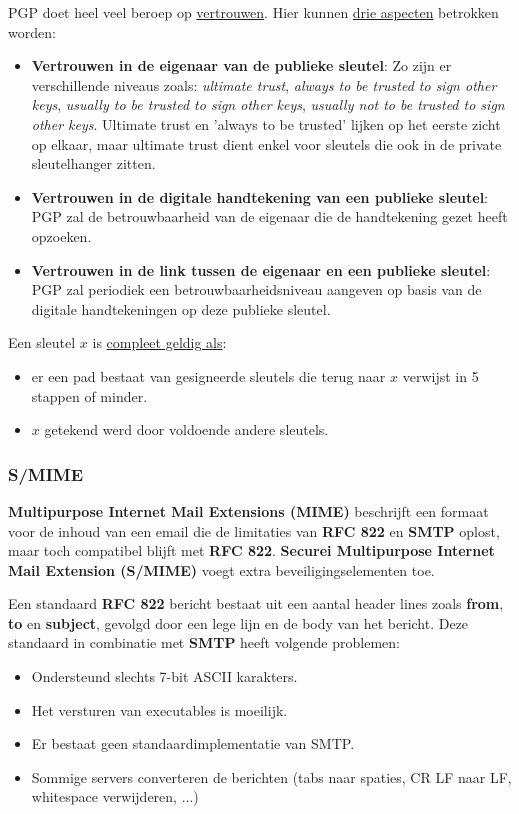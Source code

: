 \documentclass{report}
\begin{document}
	PGP doet heel veel beroep op \underline{vertrouwen}. Hier kunnen \underline{drie aspecten} betrokken worden:
	\begin{itemize}
		\item[\info] \textbf{Vertrouwen in de eigenaar van de publieke sleutel}: Zo zijn er verschillende niveaus zoals: \emph{ultimate trust}, \emph{always to be trusted to sign other keys}, \emph{usually to be trusted to sign other keys}, \emph{usually not to be trusted to sign other keys}. Ultimate trust en 'always to be trusted' lijken op het eerste zicht op elkaar, maar ultimate trust dient enkel voor sleutels die ook in de private sleutelhanger zitten.
		\item[\info] \textbf{Vertrouwen in de digitale handtekening van een publieke sleutel}: PGP zal de betrouwbaarheid van de eigenaar die de handtekening gezet heeft opzoeken.
		\item[\info] \textbf{Vertrouwen in de link tussen de eigenaar en een publieke sleutel}: PGP zal periodiek een betrouwbaarheidsniveau aangeven op basis van de digitale handtekeningen op deze publieke sleutel.
	\end{itemize}

	Een sleutel $x$ is \underline{compleet geldig als}:
	\begin{itemize}
		\item[\info] er een pad bestaat van gesigneerde sleutels die terug naar $x$ verwijst in 5 stappen of minder.
		\item[\info] $x$ getekend werd door voldoende andere sleutels.
	\end{itemize}

	\subsubsection{S/MIME}
	\textbf{Multipurpose Internet Mail Extensions (MIME)} beschrijft een formaat voor de inhoud van een email die de limitaties van \textbf{RFC 822} en \textbf{SMTP} oplost, maar toch compatibel blijft met \textbf{RFC 822}. \textbf{Securei Multipurpose Internet Mail Extension (S/MIME)} voegt extra beveiligingselementen toe.

	Een standaard \textbf{RFC 822} bericht bestaat uit een aantal header lines zoals \textbf{from}, \textbf{to} en \textbf{subject}, gevolgd door een lege lijn en de body van het bericht. Deze standaard in combinatie met \textbf{SMTP} heeft volgende problemen:
	\begin{itemize}
		\item[\alert] Ondersteund slechts 7-bit ASCII karakters.
		\item[\alert] Het versturen van executables is moeilijk.
		\item[\alert] Er bestaat geen standaardimplementatie van SMTP.
		\item[\alert] Sommige servers converteren de berichten (tabs naar spaties, CR LF naar LF, whitespace verwijderen, ...)
	\end{itemize}
\end{document}
